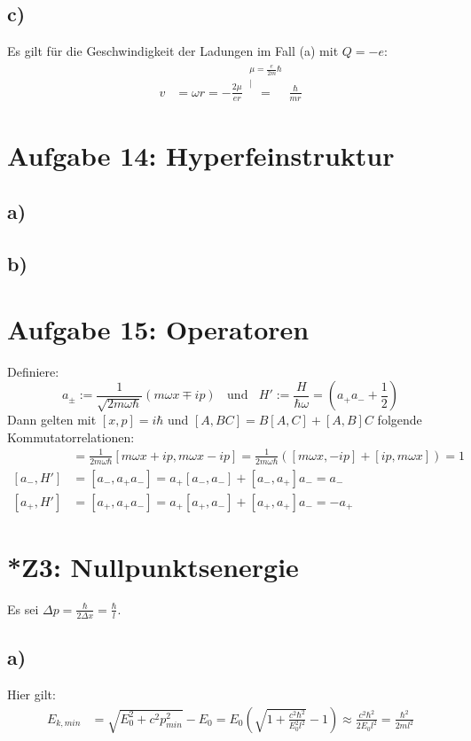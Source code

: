 \documentclass[a4paper,12pt]{article}
\newcommand{\kom}{}
\newcommand{\kla}{}
\newcommand{\klam}{}
\begin{document}
\subsection*{c)}
Es gilt für die Geschwindigkeit der Ladungen im Fall (a) mit $Q=-e$:
\begin{align*}
v&=\omega r=-\frac{2\mu }{er}\kom\overset{\substack{{\mu = \frac{e}{2m}\hbar} \\ |}}{=}\frac{\hbar}{mr}
\end{align*}
\section*{Aufgabe 14: Hyperfeinstruktur}
\subsection*{a)}
\subsection*{b)}
\section*{Aufgabe 15: Operatoren}
Definiere:
$$a_\pm :=\frac{1}{\sqrt{2m\omega\hbar}}\kla\left( {m\omega x\mp ip} \right)\ \ \ \ \mathrm{und}\ \ \ \ H':=\frac{H}{\hbar\omega}=\left(a_+a_-+\frac{1}{2}\right)$$
Dann gelten mit $[x,p]=i\hbar$ und $[A,BC]=B[A,C]+[A,B]C$ folgende Kommutatorrelationen:
\begin{align*}
[a_-,a_+]&=\frac{1}{2m\omega\hbar}\klam\left[ {m\omega x +ip, m\omega x-ip} \right]=\frac{1}{2m\omega\hbar}\kla\left( {[m\omega x, -ip] + [ip, m\omega x]} \right)=1 \\
[a_-, H']&=\klam\left[ {a_-, a_+a_-} \right]=a_+[a_-,a_-]+[a_-,a_+]a_-=a_- \\
[a_+, H']&=\klam\left[ {a_+, a_+a_-} \right]=a_+[a_+,a_-]+[a_+,a_+]a_-=-a_+
\end{align*}
\section*{*Z3: Nullpunktsenergie}
Es sei $\Delta p=\frac{\hbar}{2\Delta x}=\frac{\hbar}{l}$. 
\subsection*{a)}
Hier gilt:
\begin{align*}
E_{k,min}&=\sqrt{E_0^2+c^2p_{min}^2}-E_0=E_0\kla\left( {\sqrt{1+\frac{c^2\hbar^2}{E_0^2l^2}}-1} \right)\approx \frac{c^2\hbar^2}{2E_0l^2}=\frac{\hbar^2}{2ml^2}
\end{align*}
\end{document}
